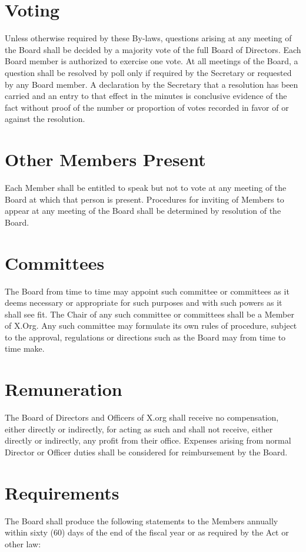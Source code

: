 \documentclass[10pt, english]{bylaws}
\begin{document}
\section{Voting}
Unless otherwise required by these By-laws, questions arising at any meeting of
the Board shall be decided by a majority vote of the full Board of Directors.
Each Board member is authorized to exercise one vote. At all meetings of the
Board, a question shall be resolved by poll only if required by the Secretary or
requested by any Board member. A declaration by the Secretary that a resolution
has been carried and an entry to that effect in the minutes is conclusive
evidence of the fact without proof of the number or proportion of votes recorded
in favor of or against the resolution.

\section{Other Members Present}
Each Member shall be entitled to speak but not to vote at any meeting of the
Board at which that person is present. Procedures for inviting of Members to
appear at any meeting of the Board shall be determined by resolution of the
Board.

\section{Committees}
The Board from time to time may appoint such committee or committees as it deems
necessary or appropriate for such purposes and with such powers as it shall see
fit. The Chair of any such committee or committees shall be a Member of X.Org.
Any such committee may formulate its own rules of procedure, subject to the
approval, regulations or directions such as the Board may from time to time
make.

\section{Remuneration}
The Board of Directors and Officers of X.org shall receive no compensation,
either directly or indirectly, for acting as such and shall not receive, either
directly or indirectly, any profit from their office. Expenses arising from
normal Director or Officer duties shall be considered for reimbursement by the
Board.

\section{Requirements}
The Board shall produce the following statements to the Members annually within
sixty (60) days of the end of the fiscal year or as required by the Act or
other law:
\end{document}
